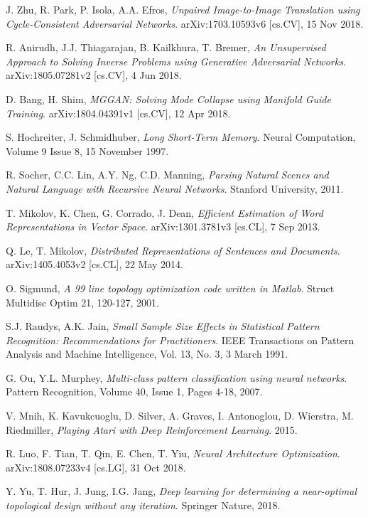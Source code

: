 \documentclass[../main.tex]{subfiles}
\begin{document}
\begin{thebibliography}{999}
  J. Zhu, R. Park, P. Isola, A.A. Efros,
  \emph{Unpaired Image-to-Image Translation using Cycle-Consistent Adversarial Networks}.
  arXiv:1703.10593v6 [cs.CV],
  15 Nov 2018.

  R. Anirudh, J.J. Thiagarajan, B. Kailkhura, T. Bremer,
  \emph{An Unsupervised Approach to Solving Inverse Problems using Generative Adversarial Networks}.
  arXiv:1805.07281v2 [cs.CV],
  4 Jun 2018.

  D. Bang, H. Shim,
  \emph{MGGAN: Solving Mode Collapse using Manifold Guide Training}.
  arXiv:1804.04391v1 [cs.CV],
  12 Apr 2018.

  S. Hochreiter, J. Schmidhuber,
  \emph{Long Short-Term Memory}.
  Neural Computation,
  Volume 9 Issue 8,
  15 November 1997.

  R. Socher, C.C. Lin, A.Y. Ng, C.D. Manning,
  \emph{Parsing Natural Scenes and Natural Language with Recursive Neural Networks}.
  Stanford University,
  2011.

  T. Mikolov, K. Chen, G. Corrado, J. Dean,
  \emph{Efficient Estimation of Word Representations in Vector Space}.
  arXiv:1301.3781v3 [cs.CL],
  7 Sep 2013.

  Q. Le, T. Mikolov,
  \emph{Distributed Representations of Sentences and Documents}.
  arXiv:1405.4053v2 [cs.CL],
  22 May 2014.

  O. Sigmund,
  \emph{A 99 line topology optimization code written in Matlab}.
  Struct Multidisc Optim 21,
  120-127,
  2001.

  S.J. Raudys, A.K. Jain,
  \emph{Small Sample Size Effects in Statistical Pattern Recognition: Recommendations for Practitioners}.
  IEEE Transactions on Pattern Analysis and Machine Intelligence,
  Vol. 13, No. 3,
  3 March 1991.

  G. Ou, Y.L. Murphey,
  \emph{Multi-class pattern classification using neural networks}.
  Pattern Recognition,
  Volume 40, Issue 1, Pages 4-18,
  2007.

  V. Mnih, K. Kavukcuoglu, D. Silver, A. Graves, I. Antonoglou, D. Wierstra, M. Riedmiller,
  \emph{Playing Atari with Deep Reinforcement Learning}.
  2015.


  R. Luo, F. Tian, T. Qin, E. Chen, T. Yiu,
  \emph{Neural Architecture Optimization}.
  arXiv:1808.07233v4 [cs.LG],
  31 Oct 2018.

  Y. Yu, T. Hur, J. Jung, I.G. Jang,
  \emph{Deep learning for determining a near-optimal topological design without any iteration}.
  Springer Nature,
  2018.

\end{thebibliography}
\end{document}
